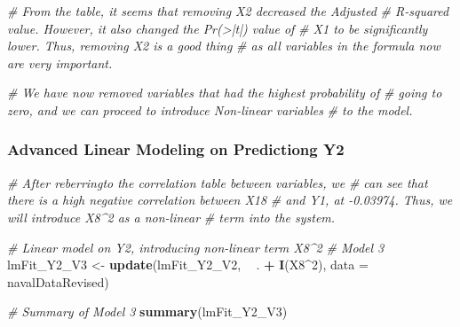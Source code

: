 \documentclass[
]{article}
\newenvironment{Shaded}{\begin{snugshade}}{\end{snugshade}}
\newcommand{\CommentTok}[1]{\textcolor[rgb]{0.56,0.35,0.01}{\textit{#1}}}
\newcommand{\DataTypeTok}[1]{\textcolor[rgb]{0.13,0.29,0.53}{#1}}
\newcommand{\DecValTok}[1]{\textcolor[rgb]{0.00,0.00,0.81}{#1}}
\newcommand{\KeywordTok}[1]{\textcolor[rgb]{0.13,0.29,0.53}{\textbf{#1}}}
\newcommand{\NormalTok}[1]{#1}
\newcommand{\OperatorTok}[1]{\textcolor[rgb]{0.81,0.36,0.00}{\textbf{#1}}}
\newcommand{\StringTok}[1]{\textcolor[rgb]{0.31,0.60,0.02}{#1}}
\begin{document}
\begin{Shaded}
\begin{Highlighting}[]
\CommentTok{# From the table, it seems that removing X2 decreased the Adjusted }
\CommentTok{# R-squared value. However, it also changed the Pr(>|t|) value of }
\CommentTok{# X1 to be significantly lower. Thus, removing X2 is a good thing}
\CommentTok{# as all variables in the formula now are very important.}

\CommentTok{# We have now removed variables that had the highest probability of}
\CommentTok{# going to zero, and we can proceed to introduce Non-linear variables}
\CommentTok{# to the model.}
\end{Highlighting}
\end{Shaded}

\hypertarget{advanced-linear-modeling-on-predictiong-y2}{%
\subsubsection{Advanced Linear Modeling on Predictiong
Y2}\label{advanced-linear-modeling-on-predictiong-y2}}

\begin{Shaded}
\begin{Highlighting}[]
\CommentTok{# After reberringto the correlation table between variables, we}
\CommentTok{# can see that there is a high negative correlation between X18  }
\CommentTok{# and Y1, at -0.03974. Thus, we will introduce X8^2 as a non-linear }
\CommentTok{# term into the system.}

\CommentTok{# Linear model on Y2, introducing non-linear term X8^2}
\CommentTok{# Model 3}
\NormalTok{lmFit_Y2_V3 <-}\StringTok{ }\KeywordTok{update}\NormalTok{(lmFit_Y2_V2, }\OperatorTok{~}\StringTok{ }\NormalTok{. }\OperatorTok{+}\StringTok{ }\KeywordTok{I}\NormalTok{(X8}\OperatorTok{^}\DecValTok{2}\NormalTok{), }\DataTypeTok{data =}\NormalTok{ navalDataRevised)}

\CommentTok{# Summary of Model 3}
\KeywordTok{summary}\NormalTok{(lmFit_Y2_V3)}
\end{Highlighting}
\end{Shaded}
\end{document}
